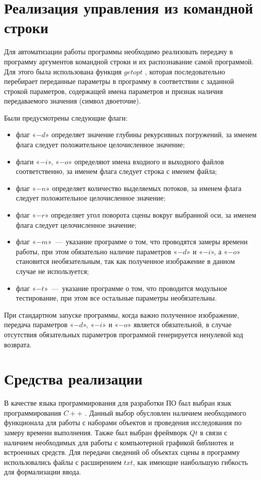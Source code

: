 \section{Реализация управления из командной строки}
Для автоматизации работы программы необходимо реализовать передачу в программу аргументов командной строки и их распознавание самой программой. Для этого была использована функция $getopt$ \cite{web_item17}, которая последовательно перебирает переданные параметры в программу в соответствии с заданной строкой параметров, содержащей имена параметров и признак наличия передаваемого значения (символ двоеточие).

Были предусмотрены следующие флаги:

\begin{itemize}
	\item флаг «$-d$» определяет значение глубины рекурсивных погружений, за именем флага следует положительное целочисленное значение;
	\item флаги «$-i$», «$-o$» определяют имена входного и выходного файлов соответственно, за именем флага следует строка с именем файла;
	\item флаг «$-n$» определяет количество выделяемых потоков, за именем флага следует положительное целочисленное значение;
	\item флаг «$-r$» определяет угол поворота сцены вокруг выбранной оси, за именем флага следует целочисленное значение;
	\item флаг «$-m$»~---~указание программе о том, что проводятся замеры времени работы, при этом обязательно наличие параметров «$-d$» и «$-i$», а «$-o$» становится необязательным, так как полученное изображение в данном случае не используется;
	\item флаг «$-t$»~---~указание программе о том, что проводится модульное тестирование, при этом все остальные параметры необязательны.
\end{itemize}

При стандартном запуске программы, когда важно полученное изображение, передача параметров «$-d$», «$-i$» и «$-o$» является обязательной, в случае отсутствия обязательных параметров программой генерируется ненулевой код возврата.

\section{Средства реализации}
В качестве языка программирования для разработки ПО был выбран язык программирования $C++$ \cite{web_item4}. Данный выбор обусловлен наличием необходимого функционала для работы с наборами объектов и проведения исследования по замеру времени выполнения. Также был выбран фреймворк $Qt$ \cite{web_item2} в связи с наличием необходимых для работы с компьютерной графикой библиотек и встроенных средств. Для передачи сведений об объектах сцены в программу использовались файлы с расширением $txt$, как имеющие наибольшую гибкость для формализации ввода. 

